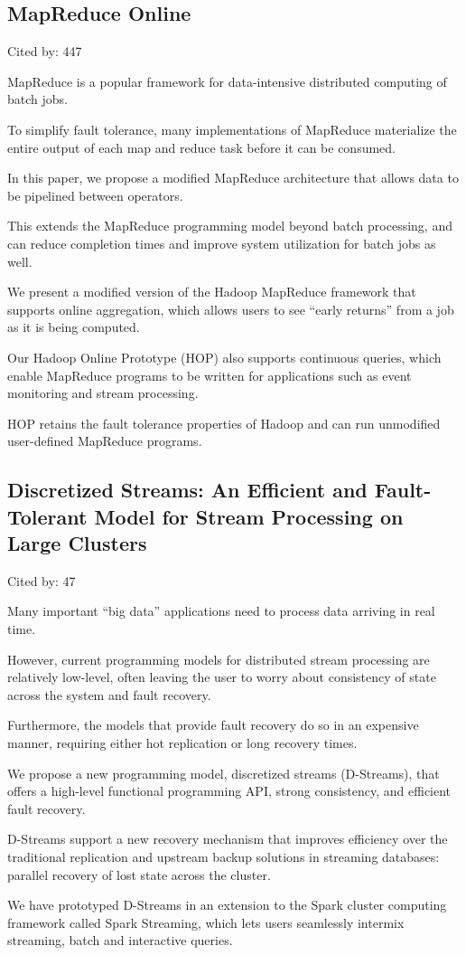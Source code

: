 \documentclass[a4paper,11pt]{article}
\begin{document}
\subsection*{MapReduce Online}
{\color{cyan} {\color{magenta} Cited by: 447}

MapReduce is a popular framework for data-intensive distributed computing of batch jobs. 

To simplify fault tolerance, 
many implementations of MapReduce 
materialize the entire output of each map and reduce task
before it can be consumed. 

In this paper, we propose a
{\color{black} modified MapReduce architecture\cite{mapredonline}} 
that allows data to be pipelined between operators. 

This extends the MapReduce programming model beyond batch processing, and
can reduce completion times and improve system utilization for batch jobs as well. 

We present 
a modified version of the Hadoop MapReduce framework that supports online aggregation, which 
allows users to see ``early returns'' from a job as it is being computed. 

Our Hadoop Online Prototype (HOP) also supports continuous queries, which
enable MapReduce programs to be written for applications
such as event monitoring and stream processing.

HOP retains the fault tolerance properties of Hadoop and can 
run unmodified user-defined MapReduce programs.	

}

\subsection*{Discretized Streams: An Efficient and Fault-Tolerant Model for Stream Processing on Large Clusters}
{\color{cyan} {\color{magenta} Cited by: 47}

Many important ``big data'' applications need to process data arriving in real time. 

However, 
current programming models for distributed stream processing are relatively low-level, 
often leaving the user to worry about consistency of state across the system and fault recovery.

Furthermore, 
the models that provide fault recovery do so in an expensive manner, 
requiring either hot replication or long recovery times. 

We propose 
a new programming model, 
{\color{black} discretized streams (D-Streams)\cite{sparkstream}}, that
offers a high-level functional programming API, 
strong consistency, and efficient fault recovery. 

D-Streams support 
a new recovery mechanism that improves efficiency over the traditional replication and 
upstream backup solutions in streaming databases: parallel recovery of lost state across the cluster. 

We have prototyped D-Streams in an extension to the Spark cluster computing framework called Spark Streaming, 
which lets users seamlessly intermix streaming, batch and interactive queries.

}
\end{document}
